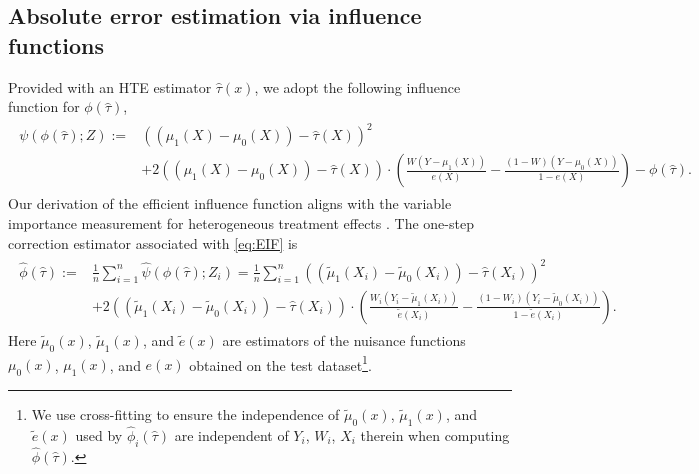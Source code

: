 \documentclass{article}
\theoremstyle{plain}
\theoremstyle{definition}
\theoremstyle{plain}
\begin{document}
\subsection{Absolute error estimation via influence functions}\label{sec:absolute.error.estimation}
Provided with an HTE estimator $\hat{\tau}(x)$,
we adopt the following influence function for $\phi(\hat{\tau})$, 
\begin{align}\label{eq:EIF}
\begin{split}    
    \psi(\phi(\hat{\tau}); Z)
    :=&  \left((\mu_1(X) - \mu_0(X)) - \hat{\tau}(X)\right)^2 \\
    &+ 2\left((\mu_1(X) - \mu_0(X)) - \hat{\tau}(X)\right) \cdot \left(\frac{W(Y - \mu_1(X))}{e(X)} - \frac{(1-W)(Y - \mu_0(X))}{1-e(X)} \right) - \phi(\hat{\tau}).
\end{split}
\end{align}
Our derivation of the efficient influence function aligns with the variable importance measurement for heterogeneous treatment effects \parencite{hines2022variable}.
The one-step correction estimator associated with \eqref{eq:EIF} is
\begin{align}\label{eq:estimator.absolute.error}
\begin{split}    
    \hat{\phi}(\hat{\tau})
    :=& \frac{1}{n} \sum_{i=1}^n \hat{\psi}(\phi(\hat{\tau}); Z_i)
    = \frac{1}{n} \sum_{i=1}^n \left((\tilde{\mu}_1(X_i) - \tilde{\mu}_0(X_i)) - \hat{\tau}(X_i)\right)^2  \\
    &+ 2\left((\tilde{\mu}_1(X_i) - \tilde{\mu}_0(X_i)) - \hat{\tau}(X_i)\right) \cdot \left(\frac{W_i(Y_i - \tilde{\mu}_1(X_i))}{\tilde{e}(X_i)} - \frac{(1-W_i)(Y_i - \tilde{\mu}_0(X_i))}{1-\tilde{e}(X_i)} \right).
\end{split}
\end{align}
Here $\tilde{\mu}_0(x)$, $\tilde{\mu}_1(x)$, and $\tilde{e}(x)$ are estimators of the nuisance functions ${\mu}_0(x)$, ${\mu}_1(x)$, and $e(x)$ obtained on the test dataset\footnote{We use cross-fitting \parencite{chernozhukov2018double} to ensure the independence of $\tilde{\mu}_0(x)$, $\tilde{\mu}_1(x)$, and $\tilde{e}(x)$ used by $\hat{\phi}_i(\hat{\tau})$ are independent of $Y_i$, $W_i$, $X_i$ therein when computing $\hat{\phi}(\hat{\tau})$.}.
\end{document}
